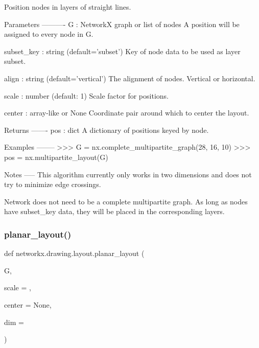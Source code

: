 \begin{DoxyVerb}Position nodes in layers of straight lines.

Parameters
----------
G : NetworkX graph or list of nodes
    A position will be assigned to every node in G.

subset_key : string (default='subset')
    Key of node data to be used as layer subset.

align : string (default='vertical')
    The alignment of nodes. Vertical or horizontal.

scale : number (default: 1)
    Scale factor for positions.

center : array-like or None
    Coordinate pair around which to center the layout.

Returns
-------
pos : dict
    A dictionary of positions keyed by node.

Examples
--------
>>> G = nx.complete_multipartite_graph(28, 16, 10)
>>> pos = nx.multipartite_layout(G)

Notes
-----
This algorithm currently only works in two dimensions and does not
try to minimize edge crossings.

Network does not need to be a complete multipartite graph. As long as nodes
have subset_key data, they will be placed in the corresponding layers.\end{DoxyVerb}
 \mbox{\label{namespacenetworkx_1_1drawing_1_1layout_aa9e8021cbef52e60e267eed205c99e1f}} 
\subsubsection{\texorpdfstring{planar\+\_\+layout()}{planar\_layout()}}
{\footnotesize\ttfamily def networkx.\+drawing.\+layout.\+planar\+\_\+layout (\begin{DoxyParamCaption}\item[{}]{G,  }\item[{}]{scale = {},  }\item[{}]{center = {\ttfamily None},  }\item[{}]{dim = {} }\end{DoxyParamCaption})}

